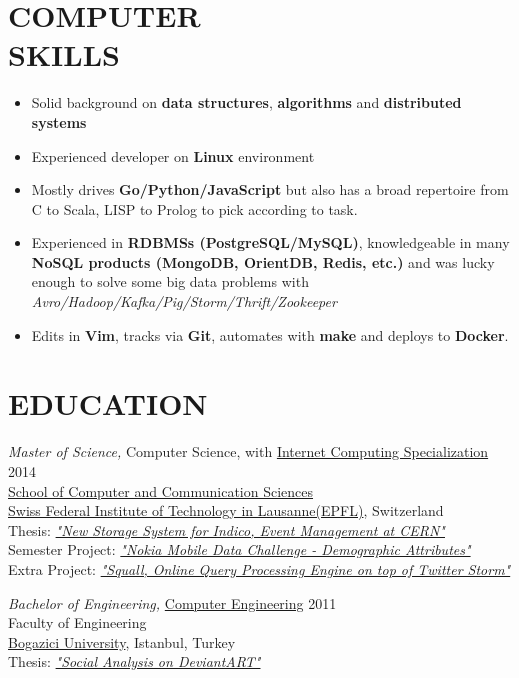 \documentclass[line, margin]{res}
\begin{document}
\begin{resume}
\section{COMPUTER \\ SKILLS}
\begin{itemize}
  \item Solid background on \textbf{data structures}, \textbf{algorithms} and \textbf{distributed systems}
  \item Experienced developer on \textbf{Linux} environment
  \item Mostly drives \textbf{Go/Python/JavaScript} but also has a broad repertoire from C to Scala, LISP to Prolog to pick according to task.
  \item Experienced in \textbf{RDBMSs (PostgreSQL/MySQL)}, knowledgeable in many \textbf{NoSQL products (MongoDB, OrientDB, Redis, etc.)} and was lucky enough to solve some big data problems with \textit{Avro/Hadoop/Kafka/Pig/Storm/Thrift/Zookeeper}
  \item Edits in \textbf{Vim}, tracks via \textbf{Git}, automates with \textbf{make} and deploys to \textbf{Docker}.
\end{itemize}

\section{EDUCATION}
{\sl Master of Science,} Computer Science, with \href{http://ic.epfl.ch/specializations#content}{Internet Computing Specialization} \hfill{2014} \\ 
  \href{http://ic.epfl.ch}{School of Computer and Communication Sciences} \\
  \href{http://epfl.ch}{Swiss Federal Institute of Technology in Lausanne(EPFL)}, Switzerland \\
  Thesis: \textit{\href{http://indico-software.org/}{"New Storage System for Indico, Event Management at CERN"}} \\
  Semester Project: \textit{\href{http://research.nokia.com/page/12000}{"Nokia Mobile Data Challenge - Demographic Attributes"}} \\
  Extra Project: \textit{\href{https://github.com/epfldata/squall}{"Squall, Online Query Processing Engine on top of Twitter Storm"}}

{\sl Bachelor of Engineering,} \href{http://www.cmpe.boun.edu.tr/}{Computer Engineering} \hfill{2011} \\
  Faculty of Engineering \\
  \href{http://boun.edu.tr/en-US/Content/Default.aspx}{Bogazici University}, Istanbul, Turkey \\
  Thesis: \textit{\href{https://github.com/ferhatelmas/deviantART-analysis}{"Social Analysis on DeviantART"}}

\end{resume}
\end{document}
